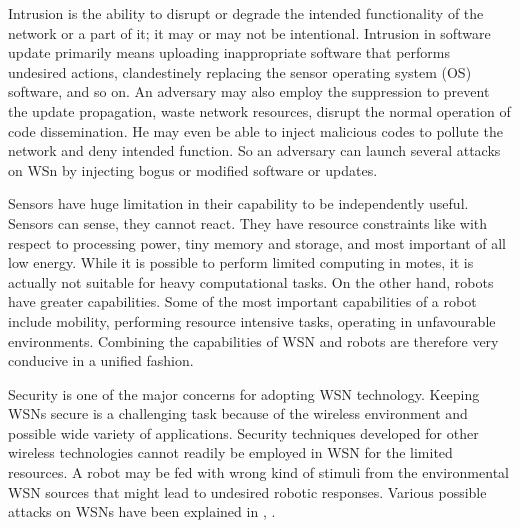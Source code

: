 \documentclass[conference,final]{IEEEtran}
\begin{document}
Intrusion is the ability to disrupt or degrade the intended functionality of the network or a part of it; it  may or may not be intentional.
Intrusion in software update primarily means uploading inappropriate software that performs undesired actions, clandestinely replacing the  sensor operating system (OS) software, and so on.
An adversary may also employ  the suppression to prevent the update propagation, waste network resources, disrupt the normal operation of code dissemination. 
He may even be able to inject malicious codes to pollute the network and deny intended function.
So an adversary can launch several attacks on WSn by  injecting bogus or modified software or updates. 


Sensors have huge limitation in their capability to be independently useful.
Sensors can sense, they cannot react. 
They have resource constraints like with respect to processing power, tiny memory and storage, and most important of all low energy.
While it is possible to perform limited computing in motes, it is actually not suitable for heavy computational tasks.
On the other hand, robots have greater capabilities.
Some of the most important capabilities of a robot include mobility, performing resource intensive tasks, operating in unfavourable environments.
Combining the capabilities of WSN and robots are therefore very conducive in a unified fashion.

Security is one of the major concerns for adopting WSN technology. 
Keeping WSNs secure is a challenging task because of the wireless environment and possible  wide variety of applications.
Security techniques developed for other wireless technologies cannot readily be employed in WSN for the limited resources.
A robot may be fed with wrong kind of stimuli from the environmental WSN sources that might  lead to undesired robotic responses. 
Various possible attacks on WSNs have been explained in \cite{roosta2006taxonomy}, \cite{roosta2008attacks}.
\end{document}
